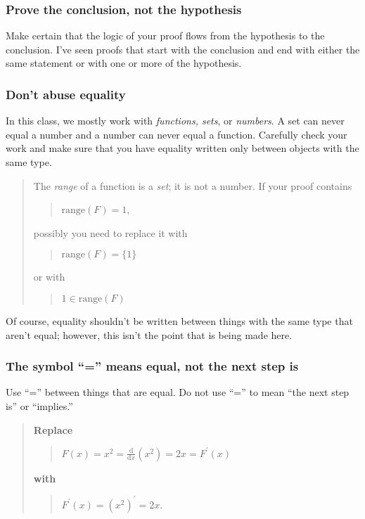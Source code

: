 \documentclass[12pt,fleqn]{article}
\newcounter{ex}\setcounter{ex}{0}
\newcounter{se}\setcounter{se}{0}
\begin{document}
 \subsubsection{ Prove the conclusion, not the hypothesis}

Make certain that the logic of your proof flows from the 
hypothesis to the conclusion. I've seen proofs that
start with the conclusion and end with either the same statement
or with one or more of the hypothesis.  



 \subsubsection{Don't abuse equality}

In this class, we mostly work with {\em functions, sets}, or {\em
numbers\/}.  A set can never equal a number and a number can never
equal a function.  Carefully check your work and make sure that you
have equality written only between objects with the same type.
\begin{quote}
The \emph{range} of a function is a \emph{set}; it is not a
number. If your proof contains
\begin{quote}
 \(\mbox{range}(F) = 1\),
\end{quote}
possibly you need to replace it with
\begin{quote}
 \(\mbox{range}(F) = \{1\}\)
\end{quote}
or with
\begin{quote}
 \(1 \in \mbox{range}(F)\)
\end{quote}
\end{quote}
Of course, equality shouldn't be written between things with the
same type that aren't equal; however, this isn't the point that 
is being made here.


 \subsubsection{ The symbol ``='' means equal, not the next step is}

Use ``='' between things that are equal. Do not use ``='' to  mean ``the next step is'' or ``implies.''

\begin{quote}
\textbf{Replace}
\begin{quote}
  \(\displaystyle F(x) = x^2 = \frac{\mathrm{d}}{\mathrm{d} x} (x^2) = 2x = F^\prime(x)\)
\end{quote}
\textbf{with}
\begin{quote}
  \(F^\prime(x) = (x^2)^\prime = 2 x. \)
\end{quote}
\end{quote}
\end{document}
